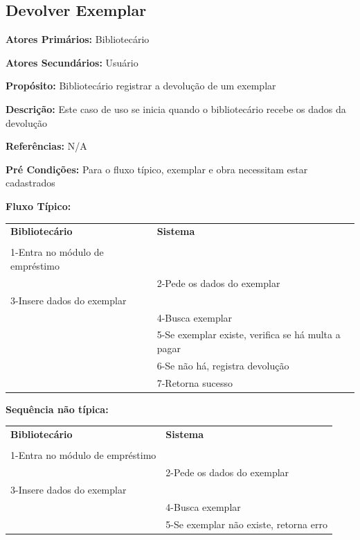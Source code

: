 \documentclass[
	12pt,				%
	openright,			%
	oneside,			%
	a4paper,			%
	english,			%
	brazil				%
	]{abntex2}
\begin{document}
\subsection{Devolver Exemplar}

\textbf{Atores Primários:} Bibliotecário

\textbf{Atores Secundários:} Usuário

\textbf{Propósito:}      Bibliotecário registrar a devolução de um exemplar

\textbf{Descrição:}      Este caso de uso se inicia quando o bibliotecário recebe os dados da devolução

\textbf{Referências:} N/A

\textbf{Pré Condições:} Para o fluxo típico, exemplar e obra necessitam estar cadastrados

\textbf{Fluxo Típico:} 

\begin{table}[H]
\ABNTEXfontereduzida
\begin{center}
\begin{tabular}{p{5.5cm} p{5.5cm}}
    \textbf{Bibliotecário} & \textbf{Sistema}\\
     & \\
    1-Entra no módulo de empréstimo & \\
     & 2-Pede os dados do exemplar\\
    3-Insere dados do exemplar & \\
     & 4-Busca exemplar\\
     & 5-Se exemplar existe, verifica se há multa a pagar\\
     & 6-Se não há, registra devolução\\
     & 7-Retorna sucesso\\
\end{tabular}
\end{center}
\end{table} 

\textbf{Sequência não típica:}

\begin{table}[H]
\ABNTEXfontereduzida
\begin{center}
\begin{tabular}{p{5.5cm} p{5.5cm}}
    \textbf{Bibliotecário} & \textbf{Sistema}\\
     & \\
    1-Entra no módulo de empréstimo & \\
     & 2-Pede os dados do exemplar\\
    3-Insere dados do exemplar & \\
     & 4-Busca exemplar\\
     & 5-Se exemplar não existe, retorna erro\\
\end{tabular}
\end{center}
\end{table}
                                                                
\end{document}
